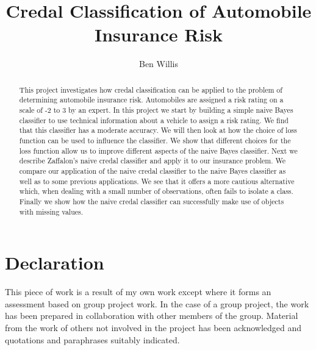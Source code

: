 \documentclass[11pt]{report}
\begin{document}
\title{Credal Classification of Automobile Insurance Risk}
\author{Ben Willis}
\maketitle

\section*{Declaration}
This piece of work is a result of my own work except where it forms an assessment
based on group project work. In the case of a group project, the work
has been prepared in collaboration with other members of the group. Material
from the work of others not involved in the project has been acknowledged and
quotations and paraphrases suitably indicated.
\newpage

\begin{abstract}
	This project investigates how credal classification can be applied to the problem of determining automobile insurance risk.
	Automobiles are assigned a risk rating on a scale of -2 to 3 by an expert.
	In this project we start by building a simple naive Bayes classifier to use technical information about a vehicle to assign a risk rating.
	We find that this classifier has a moderate accuracy.
	We will then look at how the choice of loss function can be used to influence the classifier.
	We show that different choices for the loss function allow us to improve different aspects of the naive Bayes classifier.
	Next we describe Zaffalon's naive credal classifier and apply it to our insurance problem.
	We compare our application of the naive credal classifier to the naive Bayes classifier as well as to some previous applications.
	We see that it offers a more cautious alternative which, when dealing with a small number of observations, often fails to isolate a class.
	Finally we show how the naive credal classifier can successfully make use of objects with missing values.
\end{abstract}

\tableofcontents













\end{document}
